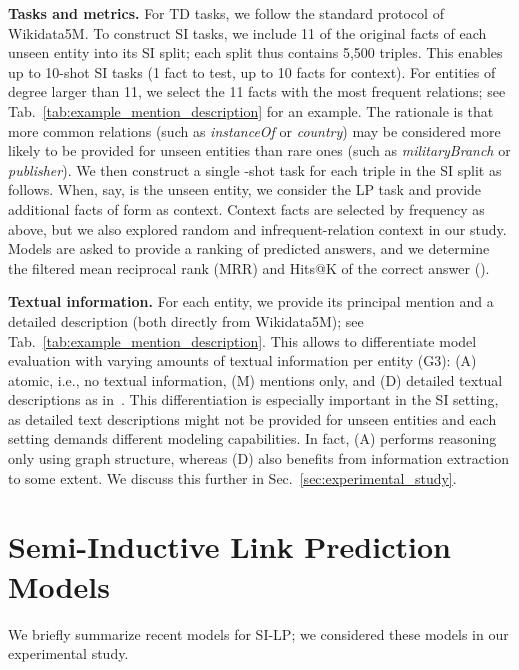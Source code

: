 \documentclass[11pt]{article}
\renewcommand\:{\colon} \newcommand{\sset}[1]{\left\{\,#1\,\right\}} \newcommand{\ssets}[1]{\left\{#1\right\}} \newcommand{\ssetn}[1]{\{\,#1\,\}}
\begin{document}
\textbf{Tasks and metrics.} For TD tasks, we follow the standard protocol of
Wikidata5M. To construct SI tasks, we include 11 of the original facts of each
unseen entity into its SI split; each split thus contains 5,500 triples. This
enables up to 10-shot SI tasks (1 fact to test, up to 10 facts for context). For
entities of degree larger than 11, we select the 11 facts with the most frequent
relations; see Tab.~\ref{tab:example_mention_description} for an example.
The rationale is that more common relations (such as \emph{instanceOf} or
\emph{country}) may be considered more likely to be provided for unseen entities
than rare ones (such as \emph{militaryBranch} or \emph{publisher}). We then
construct a single -shot task for each triple  in the SI split as
follows. When, say,  is the unseen entity, we consider the LP task 
and provide  additional facts of form  as context. Context facts
are selected by frequency as above, but we also explored random and infrequent-relation context in our study. Models are asked to provide a ranking of
predicted answers, and we determine the filtered mean reciprocal rank (MRR) and Hits@K of the
correct answer ().

\textbf{Textual information.} For each entity, we provide its principal mention
and a detailed description (both directly from Wikidata5M); see
Tab.~\ref{tab:example_mention_description}. This allows to differentiate
model evaluation with varying amounts of textual information per entity (G3):
(A) atomic, i.e., no textual information, (M) mentions only, and (D) detailed
textual descriptions as in~\cite{kochsiek2023friendly}. This differentiation is
especially important in the SI setting, as detailed text descriptions might not
be provided for unseen entities and each setting demands different modeling
capabilities. In fact, (A) performs reasoning only using graph structure,
whereas (D) also benefits from information extraction to some extent. We discuss
this further in Sec.~\ref{sec:experimental_study}.







\section{Semi-Inductive Link Prediction Models}
\label{sec:model_selection}

We briefly summarize recent models for SI-LP; we considered these models in our experimental study.
\end{document}
